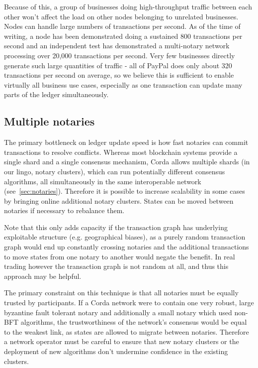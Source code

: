 \documentclass{article}
\begin{document}
Because of this, a group of businesses doing high-throughput traffic between each other won't affect the load on
other nodes belonging to unrelated businesses. Nodes can handle large numbers of transactions per second.
As of the time of writing, a node has been demonstrated doing a sustained 800 transactions per second and an
independent test has demonstrated a multi-notary network processing over 20,000 transactions per second\cite{DTCCStudy}. Very few
businesses directly generate such large quantities of traffic - all of PayPal does only about 320 transactions per
second on average\cite{PayPalTrafficVolume}, so we believe this is sufficient to enable virtually all business use
cases, especially as one transaction can update many parts of the ledger simultaneously.

\subsection{Multiple notaries}

The primary bottleneck on ledger update speed is how fast notaries can commit transactions to resolve conflicts.
Whereas most blockchain systems provide a single shard and a single consensus mechanism, Corda allows multiple
shards (in our lingo, notary clusters), which can run potentially different consensus algorithms, all
simultaneously in the same interoperable network (see~\cref{sec:notaries}). Therefore it is possible to increase
scalability in some cases by bringing online additional notary clusters. States can be moved between notaries if
necessary to rebalance them.

Note that this only adds capacity if the transaction graph has underlying exploitable structure (e.g. geographical
biases), as a purely random transaction graph would end up constantly crossing notaries and the additional
transactions to move states from one notary to another would negate the benefit. In real trading however the
transaction graph is not random at all, and thus this approach may be helpful.

The primary constraint on this technique is that all notaries must be equally trusted by participants. If a Corda
network were to contain one very robust, large byzantine fault tolerant notary and additionally a small notary
which used non-BFT algorithms, the trustworthiness of the network's consensus would be equal to the weakest link,
as states are allowed to migrate between notaries. Therefore a network operator must be careful to ensure that new
notary clusters or the deployment of new algorithms don't undermine confidence in the existing clusters.
\end{document}
